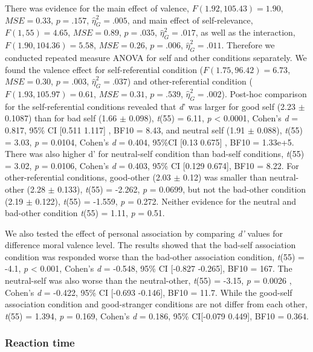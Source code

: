 \documentclass[
  english,
  man]{apa6}
\begin{document}
There was evidence for the main effect of valence, \(F(1.92, 105.43) = 1.90\), \(\mathit{MSE} = 0.33\), \(p = .157\), \(\hat{\eta}^2_G = .005\), and main effect of self-relevance, \(F(1, 55) = 4.65\), \(\mathit{MSE} = 0.89\), \(p = .035\), \(\hat{\eta}^2_G = .017\), as well as the interaction, \(F(1.90, 104.36) = 5.58\), \(\mathit{MSE} = 0.26\), \(p = .006\), \(\hat{\eta}^2_G = .011\). Therefore we conducted repeated measure ANOVA for self and other conditions separately. We found the valence effect for self-referential condition (\(F(1.75, 96.42) = 6.73\), \(\mathit{MSE} = 0.30\), \(p = .003\), \(\hat{\eta}^2_G = .037\)) and other-referential condition (\(F(1.93, 105.97) = 0.61\), \(\mathit{MSE} = 0.31\), \(p = .539\), \(\hat{\eta}^2_G = .002\)). Post-hoc comparison for the self-referential conditions revealed that \emph{d}' was larger for good self (2.23 \(\pm\) 0.1087) than for bad self (1.66 \(\pm\) 0.098), \emph{t}(55) = 6.11, \emph{p} \textless{} 0.0001, Cohen's \emph{d} = 0.817, 95\% CI {[}0.511 1.117{]} , BF10 = 8.43, and neutral self (1.91 \(\pm\) 0.088), \emph{t}(55) = 3.03, \emph{p} = 0.0104, Cohen's \emph{d} = 0.404, 95\%CI {[}0.13 0.675{]} , BF10 = 1.33e+5. There was also higher d' for neutral-self condition than bad-self conditions, \emph{t}(55) = 3.02, \emph{p} = 0.0106, Cohen's \emph{d} = 0.403, 95\% CI {[}0.129 0.674{]}, BF10 = 8.22. For other-referential conditions, good-other (2.03 \(\pm\) 0.12) was smaller than neutral-other (2.28 \(\pm\) 0.133), \emph{t}(55) = -2.262, \emph{p} = 0.0699, but not the bad-other condition (2.19 \(\pm\) 0.122), \emph{t}(55) = -1.559, \emph{p} = 0.272. Neither evidence for the neutral and bad-other condition \emph{t}(55) = 1.11, \emph{p} = 0.51.

We also tested the effect of personal association by comparing \emph{d'} values for difference moral valence level. The results showed that the bad-self association condition was responded worse than the bad-other association condition, \emph{t}(55) = -4.1, \emph{p} \textless{} 0.001, Cohen's \emph{d} = -0.548, 95\% CI {[}-0.827 -0.265{]}, BF10 = 167. The neutral-self was also worse than the neutral-other, \emph{t}(55) = -3.15, \emph{p} = 0.0026 , Cohen's \emph{d} = -0.422, 95\% CI {[}-0.693 -0.146{]}, BF10 = 11.7. While the good-self association condition and good-stranger conditions are not differ from each other, \emph{t}(55) = 1.394, \emph{p} = 0.169, Cohen's \emph{d} = 0.186, 95\% CI{[}-0.079 0.449{]}, BF10 = 0.364.

\hypertarget{reaction-time-5}{%
\subsubsection{Reaction time}\label{reaction-time-5}}
\end{document}
